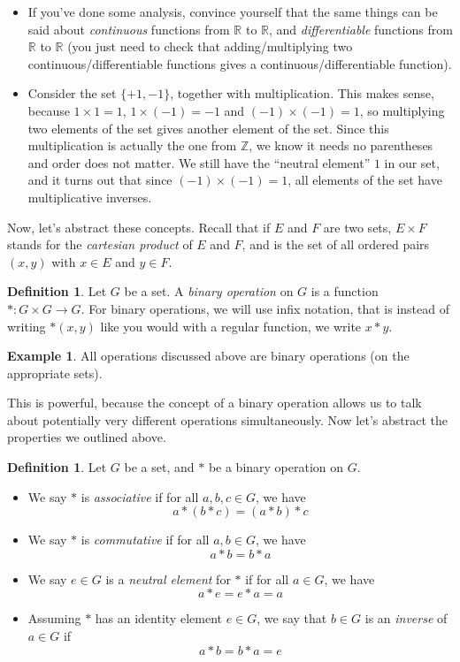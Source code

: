 \documentclass{book}
\newcommand{\Z}{\mathbb{Z}}
\newcommand{\R}{\mathbb{R}}
\theoremstyle{plain}
\theoremstyle{definition}
\newtheorem{definition}[theorem]{Definition}
\newtheorem{example}[theorem]{Example}
\theoremstyle{remark}
\begin{document}
\begin{itemize}
    \item If you've done some analysis, convince yourself that the same things can be said about \emph{continuous} functions from $\R$ to $\R$, and \emph{differentiable} functions from $\R$ to $\R$ (you just need to check that adding/multiplying two continuous/differentiable functions gives a continuous/differentiable function).
    \item Consider the set $\{+1, -1\}$, together with multiplication. This makes sense, because $1 \times 1 = 1$, $1\times(-1) = -1$ and $(-1)\times(-1) = 1$, so multiplying two elements of the set gives another element of the set. Since this multiplication is actually the one from $\Z$, we know it needs no parentheses and order does not matter. We still have the ``neutral element'' $1$ in our set, and it turns out that since $(-1)\times(-1) = 1$, all elements of the set have multiplicative inverses.
\end{itemize}

Now, let's abstract these concepts. Recall that if $E$ and $F$ are two sets, $E \times F$ stands for the \emph{cartesian product} of $E$ and $F$, and is the set of all ordered pairs $(x,y)$ with $x \in E$ and $y \in F$.

\begin{definition}
    Let $G$ be a set. A \emph{binary operation} on $G$ is a function $* : G \times G \to G$. For binary operations, we will use infix notation, that is instead of writing $*(x,y)$ like you would with a regular function, we write $x * y$.
\end{definition}

\begin{example}
    All operations discussed above are binary operations (on the appropriate sets).
\end{example}

This is powerful, because the concept of a binary operation allows us to talk about potentially very different operations simultaneously. Now let's abstract the properties we outlined above.

\begin{definition}
    Let $G$ be a set, and $*$ be a binary operation on $G$.
    \begin{itemize}
        \item We say $*$ is \emph{associative} if for all $a,b,c \in G$, we have
        \[a * (b * c) = (a*b)*c\]
        \item We say $*$ is \emph{commutative} if for all $a,b \in G$, we have
        \[a*b = b*a\]
        \item We say $e \in G$ is a \emph{neutral element} for $*$ if for all $a \in G$, we have
        \[a * e = e * a = a\]
        \item Assuming $*$ has an identity element $e \in G$, we say that $b \in G$ is an \emph{inverse} of $a \in G$ if
        \[a*b = b*a = e\]
    \end{itemize}
\end{definition}
\end{document}
